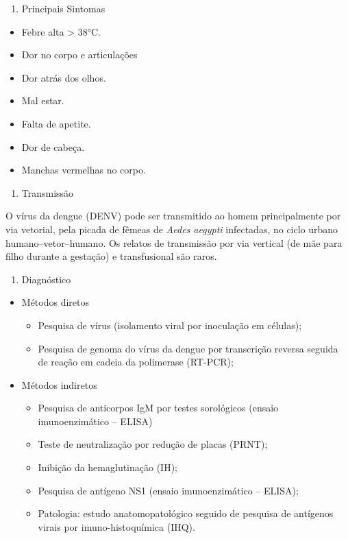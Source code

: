 \documentclass[
]{article}
\providecommand{\tightlist}{%
  \setlength{\itemsep}{0pt}\setlength{\parskip}{0pt}}
\begin{document}
\begin{enumerate}
\def\labelenumi{\roman{enumi}.}
\tightlist
\item
  Principais Sintomas
\end{enumerate}

\begin{itemize}
\tightlist
\item
  Febre alta \textgreater{} 38°C.
\item
  Dor no corpo e articulações
\item
  Dor atrás dos olhos.
\item
  Mal estar.
\item
  Falta de apetite.
\item
  Dor de cabeça.
\item
  Manchas vermelhas no corpo.
\end{itemize}

\begin{enumerate}
\def\labelenumi{\roman{enumi}.}
\setcounter{enumi}{1}
\tightlist
\item
  Transmissão
\end{enumerate}

O vírus da dengue (DENV) pode ser transmitido ao homem principalmente
por via vetorial, pela picada de fêmeas de \emph{Aedes aegypti}
infectadas, no ciclo urbano humano--vetor--humano. Os relatos de
transmissão por via vertical (de mãe para filho durante a gestação) e
transfusional são raros.

\begin{enumerate}
\def\labelenumi{\roman{enumi}.}
\setcounter{enumi}{2}
\tightlist
\item
  Diagnóstico
\end{enumerate}

\begin{itemize}
\item
  Métodos diretos

  \begin{itemize}
  \item
    Pesquisa de vírus (isolamento viral por inoculação em células);
  \item
    Pesquisa de genoma do vírus da dengue por transcrição reversa
    seguida de reação em cadeia da polimerase (RT-PCR);
  \end{itemize}
\item
  Métodos indiretos

  \begin{itemize}
  \item
    Pesquisa de anticorpos IgM por testes sorológicos (ensaio
    imunoenzimático -- ELISA)
  \item
    Teste de neutralização por redução de placas (PRNT);
  \item
    Inibição da hemaglutinação (IH);
  \item
    Pesquisa de antígeno NS1 (ensaio imunoenzimático -- ELISA);
  \item
    Patologia: estudo anatomopatológico seguido de pesquisa de antígenos
    virais por imuno-histoquímica (IHQ).
  \end{itemize}
\end{itemize}
\end{document}
